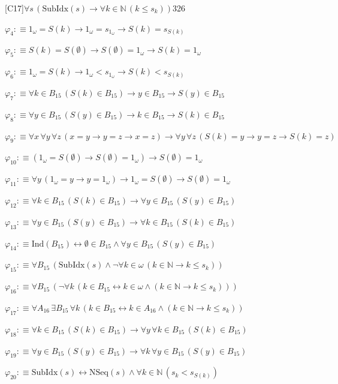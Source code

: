 \begin{fullproof}{[C17]}{$\forall s\,(\mathrm{SubIdx}(s) \to \forall k \in \mathbb{N}\,(k \leq s_{k}))$}{326}
\begin{abbrevlist}
\item $\varphi_{4} :\equiv 1_{\omega} = S(k) \to 1_{\omega} = s_{1_{\omega}} \to S(k) = s_{S(k)}$
\item $\varphi_{5} :\equiv S(k) = S(\emptyset) \to S(\emptyset) = 1_{\omega} \to S(k) = 1_{\omega}$
\item $\varphi_{6} :\equiv 1_{\omega} = S(k) \to 1_{\omega} < s_{1_{\omega}} \to S(k) < s_{S(k)}$
\item $\varphi_{7} :\equiv \forall k \in B_{15}\,(S(k) \in B_{15}) \to y \in B_{15} \to S(y) \in B_{15}$
\item $\varphi_{8} :\equiv \forall y \in B_{15}\,(S(y) \in B_{15}) \to k \in B_{15} \to S(k) \in B_{15}$
\item $\varphi_{9} :\equiv \forall x\,\forall y\,\forall z\,(x = y \to y = z \to x = z) \to \forall y\,\forall z\,(S(k) = y \to y = z \to S(k) = z)$
\item $\varphi_{10} :\equiv (1_{\omega} = S(\emptyset) \to S(\emptyset) = 1_{\omega}) \to S(\emptyset) = 1_{\omega}$
\item $\varphi_{11} :\equiv \forall y\,(1_{\omega} = y \to y = 1_{\omega}) \to 1_{\omega} = S(\emptyset) \to S(\emptyset) = 1_{\omega}$
\item $\varphi_{12} :\equiv \forall k \in B_{15}\,(S(k) \in B_{15}) \to \forall y \in B_{15}\,(S(y) \in B_{15})$
\item $\varphi_{13} :\equiv \forall y \in B_{15}\,(S(y) \in B_{15}) \to \forall k \in B_{15}\,(S(k) \in B_{15})$
\item $\varphi_{14} :\equiv \mathrm{Ind}(B_{15}) \leftrightarrow \emptyset \in B_{15} \land \forall y \in B_{15}\,(S(y) \in B_{15})$
\item $\varphi_{15} :\equiv \forall B_{15}\,(\mathrm{SubIdx}(s) \land \neg \forall k \in \omega\,(k \in \mathbb{N} \to k \leq s_{k}))$
\item $\varphi_{16} :\equiv \forall B_{15}\,(\neg \forall k\,(k \in B_{15} \leftrightarrow k \in \omega \land (k \in \mathbb{N} \to k \leq s_{k})))$
\item $\varphi_{17} :\equiv \forall A_{16}\,\exists B_{15}\,\forall k\,(k \in B_{15} \leftrightarrow k \in A_{16} \land (k \in \mathbb{N} \to k \leq s_{k}))$
\item $\varphi_{18} :\equiv \forall k \in B_{15}\,(S(k) \in B_{15}) \to \forall y\,\forall k \in B_{15}\,(S(k) \in B_{15})$
\item $\varphi_{19} :\equiv \forall y \in B_{15}\,(S(y) \in B_{15}) \to \forall k\,\forall y \in B_{15}\,(S(y) \in B_{15})$
\item $\varphi_{20} :\equiv \mathrm{SubIdx}(s) \leftrightarrow \mathrm{NSeq}(s) \land \forall k \in \mathbb{N}\,(s_{k} < s_{S(k)})$

\end{abbrevlist}
\end{fullproof}
